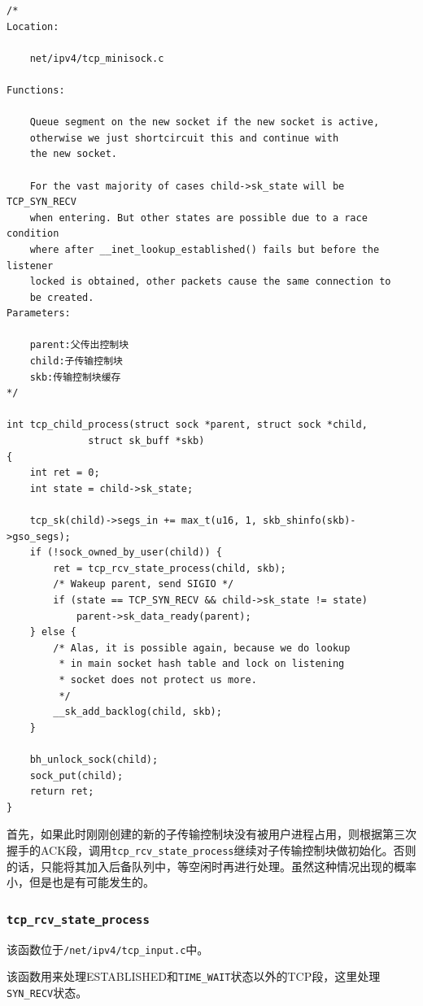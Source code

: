 \begin{verbatim}
/*
Location:

    net/ipv4/tcp_minisock.c

Functions:

    Queue segment on the new socket if the new socket is active,
    otherwise we just shortcircuit this and continue with
    the new socket.

    For the vast majority of cases child->sk_state will be TCP_SYN_RECV
    when entering. But other states are possible due to a race condition
    where after __inet_lookup_established() fails but before the listener
    locked is obtained, other packets cause the same connection to
    be created.
Parameters:

    parent:父传出控制块
    child:子传输控制块
    skb:传输控制块缓存
*/

int tcp_child_process(struct sock *parent, struct sock *child,
              struct sk_buff *skb)
{
    int ret = 0;
    int state = child->sk_state;

    tcp_sk(child)->segs_in += max_t(u16, 1, skb_shinfo(skb)->gso_segs);
    if (!sock_owned_by_user(child)) {
        ret = tcp_rcv_state_process(child, skb);
        /* Wakeup parent, send SIGIO */
        if (state == TCP_SYN_RECV && child->sk_state != state)
            parent->sk_data_ready(parent);
    } else {
        /* Alas, it is possible again, because we do lookup
         * in main socket hash table and lock on listening
         * socket does not protect us more.
         */
        __sk_add_backlog(child, skb);
    }

    bh_unlock_sock(child);
    sock_put(child);
    return ret;
}
\end{verbatim}

                首先，如果此时刚刚创建的新的子传输控制块没有被用户进程占用，则根据第三次握手的ACK段，调用\texttt{tcp_rcv_state_process}继续对子传输控制块做初始化。否则的话，只能将其加入后备队列中，等空闲时再进行处理。虽然这种情况出现的概率小，但是也是有可能发生的。

        \subsubsection{\texttt{tcp_rcv_state_process}}

            该函数位于\texttt{/net/ipv4/tcp_input.c}中。
            
            该函数用来处理ESTABLISHED和\texttt{TIME_WAIT}状态以外的TCP段，这里处理\texttt{SYN_RECV}状态。

